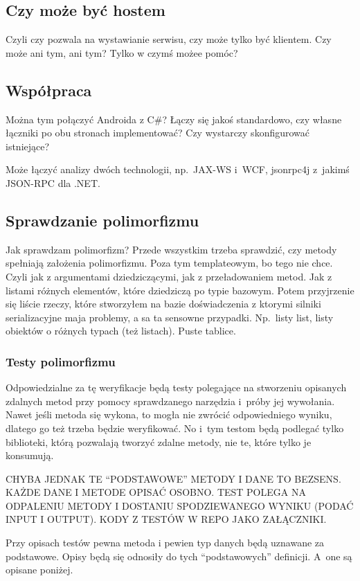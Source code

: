 \subsection{Czy może być hostem}
Czyli czy pozwala na wystawianie serwisu, czy może tylko być klientem. Czy może ani tym, ani tym? Tylko w czymś możee pomóc?

\subsection{Współpraca}
Można tym połączyć Androida z C\#?
Łączy się jakoś standardowo, czy własne łączniki po obu stronach implementować? Czy wystarczy skonfigurować istniejące?

Może łączyć analizy dwóch technologii, np.\ JAX-WS i~WCF, jsonrpc4j z~jakimś JSON-RPC dla .NET\@.

\subsection{Sprawdzanie polimorfizmu}
Jak sprawdzam polimorfizm?
Przede wszystkim trzeba sprawdzić, czy metody spełniają założenia polimorfizmu. Poza tym templateowym, bo tego nie chce. Czyli jak z argumentami dziedziczącymi, jak z przeładowaniem metod. Jak z listami różnych elementów, które dziedziczą po typie bazowym.
Potem przyjrzenie się liście rzeczy, które stworzyłem na bazie doświadczenia z ktorymi silniki serializacyjne maja problemy, a sa ta sensowne przypadki. Np.\ listy list, listy obiektów o różnych typach (też listach). Puste tablice.

\subsubsection{Testy polimorfizmu}
Odpowiedzialne za tę weryfikacje będą testy polegające na stworzeniu opisanych zdalnych metod przy pomocy sprawdzanego narzędzia i~próby jej wywołania. Nawet jeśli metoda się wykona, to mogła nie zwrócić odpowiedniego wyniku, dlatego go też trzeba będzie weryfikować. No i~tym testom będą podlegać tylko biblioteki, którą pozwalają tworzyć zdalne metody, nie te, które tylko je konsumują.

CHYBA JEDNAK TE ``PODSTAWOWE'' METODY I DANE TO BEZSENS. KAŻDE DANE I METODE OPISAĆ OSOBNO. TEST POLEGA NA ODPALENIU METODY I DOSTANIU SPODZIEWANEGO WYNIKU (PODAĆ INPUT I OUTPUT). KODY Z TESTÓW W REPO JAKO ZAŁĄCZNIKI.

Przy opisach testów pewna metoda i pewien typ danych będą uznawane za podstawowe. Opisy będą się odnosiły do tych ``podstawowych'' definicji. A~one są opisane poniżej.

